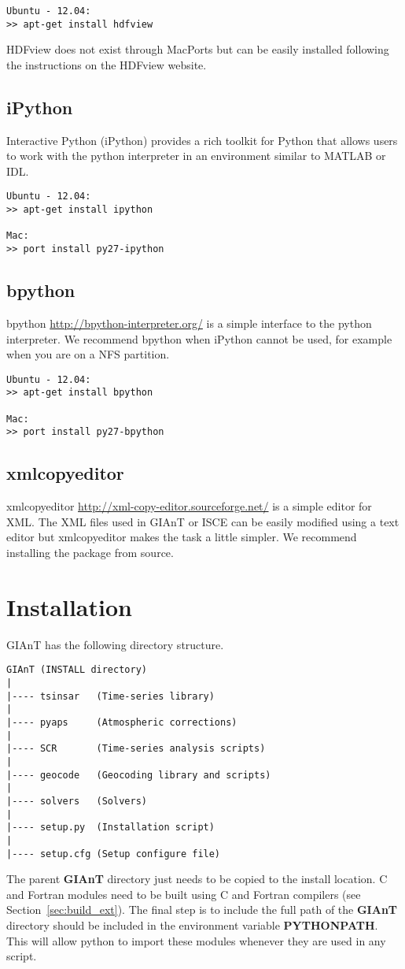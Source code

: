 \begin{verbatim}
Ubuntu - 12.04:
>> apt-get install hdfview
\end{verbatim}

HDFview does not exist through MacPorts but can be easily installed following the instructions on the HDFview website.

\subsection{iPython}
Interactive Python (iPython) \citep{ipython:software} provides a rich toolkit for Python that allows users to work with the python interpreter in an environment similar to MATLAB or IDL. 

\begin{verbatim}
Ubuntu - 12.04:
>> apt-get install ipython

Mac:
>> port install py27-ipython
\end{verbatim}

\subsection{bpython}
bpython \url{http://bpython-interpreter.org/} is a simple interface to the python interpreter. We recommend bpython when iPython cannot be used, for example when you are on a NFS partition.

\begin{verbatim}
Ubuntu - 12.04:
>> apt-get install bpython

Mac:
>> port install py27-bpython
\end{verbatim}

\subsection{xmlcopyeditor}
xmlcopyeditor \url{http://xml-copy-editor.sourceforge.net/} is a simple editor for XML. The XML files used in GIAnT or ISCE can be easily modified using a text editor but xmlcopyeditor makes the task a little simpler. We recommend installing the package from source.

\section{Installation}
\label{sec:install}

GIAnT has the following directory structure.
\begin{verbatim}
GIAnT (INSTALL directory)
|
|---- tsinsar   (Time-series library)
|
|---- pyaps     (Atmospheric corrections)
|
|---- SCR       (Time-series analysis scripts)
|
|---- geocode   (Geocoding library and scripts)
|
|---- solvers   (Solvers)
|
|---- setup.py  (Installation script)
|
|---- setup.cfg (Setup configure file)
\end{verbatim}
The parent \textbf{GIAnT} directory just needs to be copied to the install location. C and Fortran modules need to be built using C and Fortran compilers (see Section~\ref{sec:build_ext}). The final step is to include the full path of the \textbf{GIAnT} directory should be included in the environment variable \textbf{PYTHONPATH}. This will allow python to import these modules whenever they are used in any script. 

